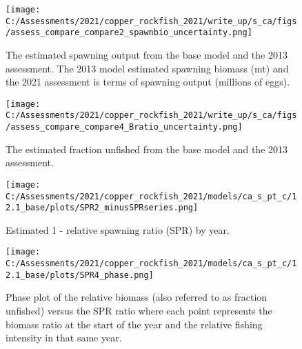 \documentclass[11pt,
  english,
  a4paper,
]{article}
\begin{document}
\tagmcend\tagstructend

\clearpage


\begin{figure}
\centering
\texttt{[image: C:/Assessments/2021/copper\_rockfish\_2021/write\_up/s\_ca/figs/assess\_compare\_compare2\_spawnbio\_uncertainty.png]}
\caption{The estimated spawning output from the base model and the 2013 assessment. The 2013 model estimated spawning biomass (mt) and the 2021 assessment is terms of spawning output (millions of eggs).\label{fig:compare-ssb-2013}}
\end{figure}

\tagmcend\tagstructend


\begin{figure}
\centering
\texttt{[image: C:/Assessments/2021/copper\_rockfish\_2021/write\_up/s\_ca/figs/assess\_compare\_compare4\_Bratio\_uncertainty.png]}
\caption{The estimated fraction unfished from the base model and the 2013 assessment.\label{fig:compare-depl-2013}}
\end{figure}

\tagmcend\tagstructend

\newpage


\begin{figure}
\centering
\texttt{[image: C:/Assessments/2021/copper\_rockfish\_2021/models/ca\_s\_pt\_c/12.1\_base/plots/SPR2\_minusSPRseries.png]}
\caption{Estimated 1 - relative spawning ratio (SPR) by year.\label{fig:1-spr}}
\end{figure}

\tagmcend\tagstructend


\begin{figure}
\centering
\texttt{[image: C:/Assessments/2021/copper\_rockfish\_2021/models/ca\_s\_pt\_c/12.1\_base/plots/SPR4\_phase.png]}
\caption{Phase plot of the relative biomass (also referred to as fraction unfished) versus the SPR ratio where each point represents the biomass ratio at the start of the year and the relative fishing intensity in that same year.\label{fig:phase}}
\end{figure}
\end{document}
